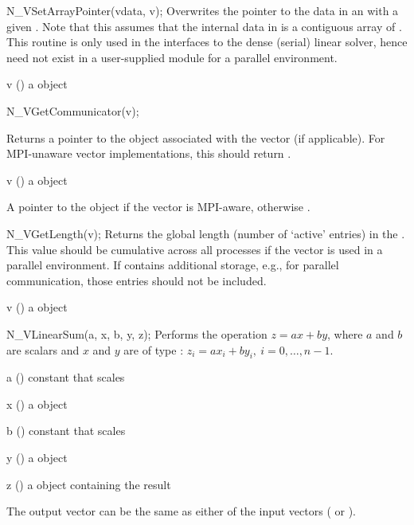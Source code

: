 {
  N\_VSetArrayPointer(vdata, v);
}
{
  Overwrites the pointer to the data in an  with a given .
  Note that this assumes that the internal data in  is a contiguous
  array of . This routine is only used in the interfaces to the dense
  (serial) linear solver, hence need not exist in a user-supplied {\nvector} module
  for a parallel environment.
}
{
  \begin{args}[v]
  \item[v] () a {\nvector} object
  \end{args}
}
{}
{}

{
  N\_VGetCommunicator(v);
}
{

  Returns a pointer to the  object associated with the
  vector (if applicable). For MPI-unaware vector implementations, this
  should return .
}
{
  \begin{args}[v]
  \item[v] () a {\nvector} object
  \end{args}
}
{
  A  pointer to the  object if the vector is MPI-aware,
  otherwise .
}
{}

{
  N\_VGetLength(v);
}
{
  Returns the global length (number of `active' entries) in the
  {\nvector} .  This value should be cumulative across all
  processes if the vector is used in a parallel environment.  If 
  contains additional storage, e.g., for parallel communication, those
  entries should not be included.
}
{
  \begin{args}[v]
  \item[v] () a {\nvector} object
  \end{args}
}
{
}
{}

{
  N\_VLinearSum(a, x, b, y, z);
}
{
  Performs the operation $z = a x + b y$, where $a$ and $b$ are 
  scalars and $x$ and $y$ are of type :
  $z_i = a x_i + b y_i, \: i=0,\ldots,n-1$.
}
{
  \begin{args}[a]
  \item[a] () constant that scales 
  \item[x] () a {\nvector} object
  \item[b] () constant that scales 
  \item[y] () a {\nvector} object
  \item[z] () a {\nvector} object containing the result
  \end{args}
}
{
  The output vector  can be the same as either of the input vectors ( or ).
}
{}

